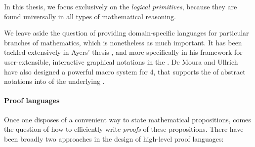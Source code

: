 \begin{emphpar}
  In this thesis, we focus exclusively on the \emph{logical primitives}, because
  they are found universally in all types of mathematical reasoning. 
\end{emphpar}

\AP
We leave aside the question of providing domain-specific languages for
particular branches of mathematics, which is nonetheless as much important. It
has been tackled extensively in Ayers' thesis , and more
specifically in his framework  for user-extensible,
interactive graphical notations in the  
. De Moura and Ullrich have also designed a
powerful macro system for  4, that supports the  of
abstract notations into  of the underlying 
.

\paragraph{Proof languages}

Once one disposes of a convenient way to state mathematical propositions, comes
the question of how to efficiently write \emph{proofs} of these propositions.
There have been broadly two approaches in the design of high-level proof
languages:

